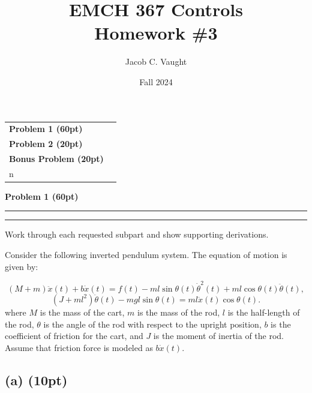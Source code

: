 \documentclass[12pt]{article}
\title{EMCH 367 Controls \\ Homework \#3}
\author{Jacob C. Vaught}
\date{Fall 2024}
\newcommand{\question}[1]{%
  \clearpage
  \vspace{0.5cm}
  {\noindent\normalsize \textbf{#1}}
  \vspace{0.2cm}
  \hrule
  \vspace{0.1cm}
  \hrule
  \vspace{0.3cm}
}
\begin{document}
\maketitle
\setlength{\parindent}{0pt}

\begin{center}
\begin{tcolorbox}[colback=white, colframe=gray!50!black, colbacktitle=gray!20!white,
                  coltitle=black, sharp corners, boxrule=1pt,
                  title=\Large\bfseries Table of Contents]
\begin{tabular}{p{}r}
\textbf{Problem 1 (60pt)} \dotfill & \textbf{\pageref{quest:1}} \\[0.3em]
\textbf{Problem 2 (20pt)} \dotfill & \textbf{\pageref{quest:2}} \\[0.3em]
\textbf{Bonus Problem (20pt)} \dotfill & \textbf{\pageref{quest:3}} \\n\end{tabular}
\vspace{0.2cm}
\end{tcolorbox}
\end{center}


\question{Problem 1 (60pt)}\label{quest:1}
\begin{stepbox}
Work through each requested subpart and show supporting derivations.
\end{stepbox}


Consider the following inverted pendulum system. The equation of motion is given by:

\begin{equation*}
(M + m) \ddot{x}(t) + b \dot{x}(t) = f(t) - ml \sin \theta(t) \dot{\theta}^2(t) + ml \cos \theta(t) \ddot{\theta}(t), \tag{1}
\end{equation*}
\begin{equation*}
(J + ml^2)\ddot{\theta}(t) - mgl \sin \theta(t) = ml \ddot{x}(t) \cos \theta(t). \tag{2}
\end{equation*}
\noindent
where \( M \) is the mass of the cart, \( m \) is the mass of the rod, \( l \) is the half-length of the rod, \( \theta \) is the angle of the rod with respect to the upright position, \( b \) is the coefficient of friction for the cart, and \( J \) is the moment of inertia of the rod. Assume that friction force is modeled as \( b\dot{x}(t) \).

\subsection*{(a) (10pt)}
\end{document}
